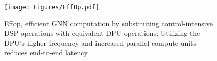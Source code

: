 





\begin{figure}[t!]
\begin{center}
\texttt{[image: Figures/EffOp.pdf]}%
\end{center}
\caption{Effop, efficient GNN computation by substituting control-intensive DSP operations with equivalent DPU operations: Utilizing the DPU’s higher frequency and increased parallel compute units reduces end-to-end latency.}\label{fig:EffOp}
\end{figure}














